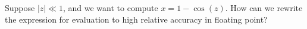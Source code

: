 \documentclass[12pt, leqno]{article}
\begin{document}

Suppose $|z| \ll 1$, and we want to compute $x = 1-\cos(z)$.
How can we rewrite the expression for evaluation to high relative accuracy
in floating point?
\end{document}
